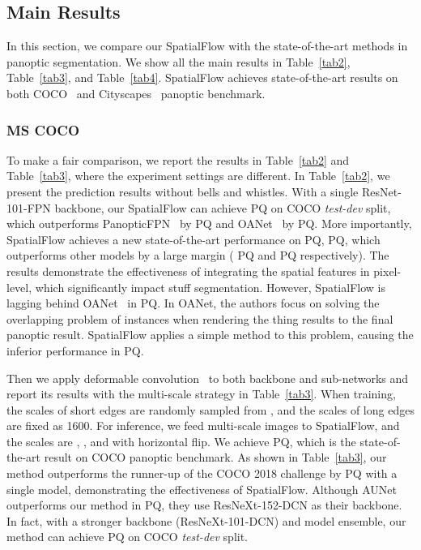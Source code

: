 \documentclass[journal,final]{IEEEtran}
\begin{document}
\subsection{Main Results}
In this section, we compare our SpatialFlow with the state-of-the-art methods in panoptic segmentation. We show all the main results in Table~\ref{tab2}, Table~\ref{tab3}, and Table~\ref{tab4}. SpatialFlow achieves state-of-the-art results on both COCO~\cite{coco} and Cityscapes~\cite{cityscapes} panoptic benchmark.

\subsubsection{MS COCO} 
To make a fair comparison, we report the results in Table~\ref{tab2} and Table~\ref{tab3}, where the experiment settings are different. In Table~\ref{tab2}, we present the prediction results without bells and whistles. With a single ResNet-101-FPN backbone, our SpatialFlow can achieve  PQ on COCO {\em test-dev} split, which outperforms PanopticFPN~\cite{panopticfpn} by  PQ and OANet~\cite{panopticranking} by  PQ. More importantly, SpatialFlow achieves a new state-of-the-art performance on PQ,  PQ, which outperforms other models by a large margin ( PQ and  PQ respectively). The results demonstrate the effectiveness of integrating the spatial features in pixel-level, which significantly impact stuff segmentation. However, SpatialFlow is lagging behind OANet~\cite{panopticranking} in PQ. In OANet, the authors focus on solving the overlapping problem of instances when rendering the thing results to the final panoptic result. SpatialFlow applies a simple method to this problem, causing the inferior performance in PQ.

Then we apply deformable convolution~\cite{deformable} to both backbone and sub-networks and report its results with the multi-scale strategy in Table~\ref{tab3}. When training, the scales of short edges are randomly sampled from , and the scales of long edges are fixed as 1600. For inference, we feed multi-scale images to SpatialFlow, and the scales are , , and  with horizontal flip. We achieve  PQ, which is the state-of-the-art result on COCO panoptic benchmark. As shown in Table~\ref{tab3}, our method outperforms the runner-up of the COCO 2018 challenge by  PQ with a single model, demonstrating the effectiveness of SpatialFlow. Although AUNet outperforms our method in PQ, they use ResNeXt-152-DCN as their backbone. In fact, with a stronger backbone (ResNeXt-101-DCN) and model ensemble, our method can achieve  PQ on COCO {\em test-dev} split. 
\end{document}
